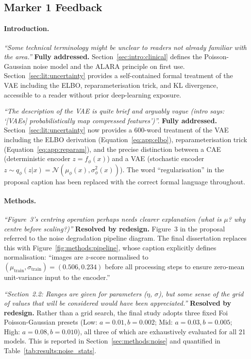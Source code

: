 \documentclass[12pt, a4paper, twoside, openright]{book}
\begin{document}
\begin{appendices}
\section*{Marker 1 Feedback}

\paragraph{Introduction.}
\textit{``Some technical terminology might be unclear to readers not already familiar with the area.''}
\textbf{Fully addressed.} Section~\ref{sec:intro:clinical} defines the Poisson-Gaussian noise model and the ALARA principle on first use. Section~\ref{sec:lit:uncertainty} provides a self-contained formal treatment of the VAE including the ELBO, reparameterisation trick, and KL divergence, accessible to a reader without prior deep-learning exposure.

\textit{``The description of the VAE is quite brief and arguably vague (intro says: `[VAEs] probabilistically map compressed features')''.}
\textbf{Fully addressed.} Section~\ref{sec:lit:uncertainty} now provides a 600-word treatment of the VAE including the ELBO derivation (Equation~\ref{eq:app:elbo}), reparameterisation trick (Equation~\ref{eq:app:reparam}), and the precise distinction between a CAE (deterministic encoder $z = f_\phi(x)$) and a VAE (stochastic encoder $z \sim q_\phi(z|x) = \mathcal{N}(\mu_\phi(x), \sigma^2_\phi(x))$). The word ``regularisation'' in the proposal caption has been replaced with the correct formal language throughout.

\paragraph{Methods.}
\textit{``Figure~3's centring operation perhaps needs clearer explanation (what is $\mu$? why centre before scaling?)''}
\textbf{Resolved by redesign.} Figure~3 in the proposal referred to the noise degradation pipeline diagram. The final dissertation replaces this with Figure~\ref{fig:methods:pipeline}, whose caption explicitly defines normalisation: ``images are $z$-score normalised to $(\mu_{\mathrm{train}}, \sigma_{\mathrm{train}}) = (0.506, 0.234)$ before all processing steps to ensure zero-mean unit-variance input to the encoder.''

\textit{``Section~2.2: Ranges are given for parameters ($\eta$, $\sigma$), but some sense of the grid of values that will be considered would have been appreciated.''}
\textbf{Resolved by redesign.} Rather than a grid search, the final study adopts three fixed Foi Poisson-Gaussian presets (Low: $a=0.01, b=0.002$; Mid: $a=0.03, b=0.005$; High: $a=0.08, b=0.010$), all three of which are exhaustively evaluated for all 21 models. This is reported in Section~\ref{sec:methods:noise} and quantified in Table~\ref{tab:results:noise_stats}.


\end{appendices}
\end{document}
